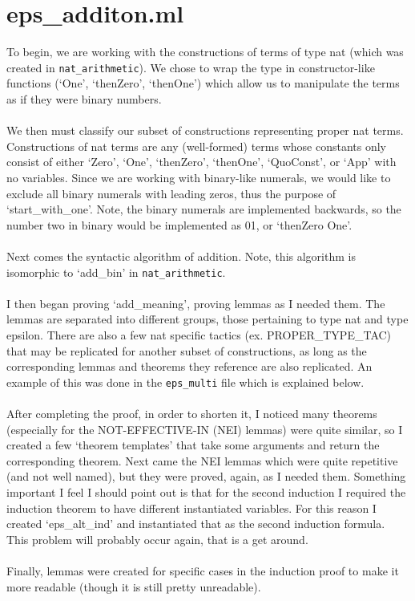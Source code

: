 \documentclass{article}
\def\c#1{\texttt{#1}}
\begin{document}
\section{eps\_additon.ml}
To begin, we are working with the constructions of terms of type nat (which was created in \c{nat\_arithmetic}). We chose to wrap the type in constructor-like functions (`One', `thenZero', `thenOne') which allow us to manipulate the terms as if they were binary numbers. 
\\
\\ 
We then must classify our subset of constructions representing proper nat terms. Constructions of nat terms are any (well-formed) terms whose constants only consist of either `Zero', `One', `thenZero', `thenOne', `QuoConst', or `App' with no variables. Since we are working with binary-like numerals, we would like to exclude all binary numerals with leading zeros, thus the purpose of `start\_with\_one'. Note, the binary numerals are implemented backwards, so the number two in binary would be implemented as 01, or `thenZero One'.
\\
\\
Next comes the syntactic algorithm of addition. Note, this algorithm is isomorphic to `add\_bin' in \c{nat\_arithmetic}. 
\\
\\
I then began proving `add\_meaning', proving lemmas as I needed them. The lemmas are separated into different groups, those pertaining to type nat and type epsilon. There are also a few nat specific tactics (ex. PROPER\_TYPE\_TAC) that may be replicated for another subset of constructions, as long as the corresponding lemmas and theorems they reference are also replicated. An example of this was done in the \c{eps\_multi} file which is explained below. 
\\
\\
After completing the proof, in order to shorten it, I noticed many theorems (especially for the NOT-EFFECTIVE-IN (NEI) lemmas) were quite similar, so I created a few `theorem templates' that take some arguments and return the corresponding theorem. Next came the NEI lemmas which were quite repetitive (and not well named), but they were proved, again, as I needed them. Something important I feel I should point out is that for the second induction I required the induction theorem to have different instantiated variables. For this reason I created `eps\_alt\_ind' and instantiated that as the second induction formula. This problem will probably occur again, that is a get around. 
\\
\\
Finally, lemmas were created for specific cases in the induction proof to make it more readable (though it is still pretty unreadable).
\end{document}
